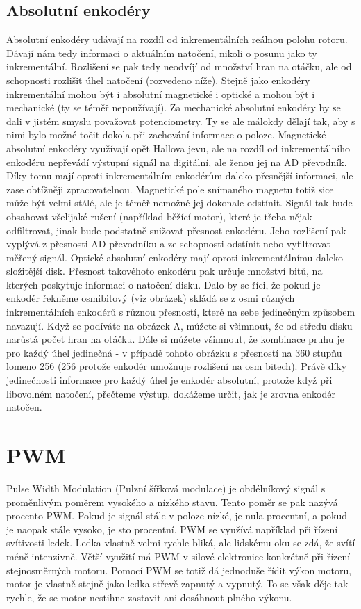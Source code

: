 \documentclass{template/socthesis}
\begin{document}
	\subsection*{Absolutní enkodéry}
	Absolutní enkodéry udávají na rozdíl od inkrementálních reálnou polohu rotoru. Dávají nám tedy informaci o aktuálním natočení, nikoli o posunu jako ty inkrementální. Rozlišení se pak tedy neodvíjí od množství hran na otáčku, ale od schopnosti rozlišit úhel natočení (rozvedeno níže). Stejně jako enkodéry inkrementální mohou být i absolutní magnetické i optické a mohou být i mechanické (ty se téměř nepoužívají). Za mechanické absolutní enkodéry by se dali v jistém smyslu považovat potenciometry. Ty se ale málokdy dělají tak, aby s nimi bylo možné točit dokola při zachování informace o poloze. Magnetické absolutní enkodéry využívají opět Hallova jevu, ale na rozdíl od inkrementálního enkodéru nepřevádí výstupní signál na digitální, ale ženou jej na AD převodník. Díky tomu mají oproti inkrementálním enkodérům daleko přesnější informaci, ale zase obtížněji zpracovatelnou. Magnetické pole snímaného magnetu totiž sice může být velmi stálé, ale je téměř nemožné jej dokonale odstínit. Signál tak bude obsahovat všelijaké rušení (například běžící motor), které je třeba nějak odfiltrovat, jinak bude podstatně snižovat přesnost enkodéru. Jeho rozlišení pak vyplývá z přesnosti AD převodníku a ze schopnosti odstínit nebo vyfiltrovat měřený signál. Optické absolutní enkodéry mají oproti inkrementálnímu daleko složitější disk. Přesnost takovéhoto enkodéru pak určuje množství bitů, na kterých poskytuje informaci o natočení disku. Dalo by se říci, že pokud je enkodér řekněme osmibitový (viz obrázek) skládá se z osmi různých inkrementálních enkodérů s různou přesností, které na sebe jedinečným způsobem navazují.	Když se podíváte na obrázek A, můžete si všimnout, že od středu disku narůstá počet hran na otáčku. Dále si můžete všimnout, že kombinace pruhu je pro každý úhel jedinečná - v případě tohoto obrázku s přesností na 360 stupňu lomeno 256 (256 protože enkodér umožnuje rozlišení na osm bitech). Právě díky jedinečnosti informace pro každý úhel je enkodér absolutní, protože když při libovolném natočení, přečteme výstup, dokážeme určit, jak je zrovna enkodér natočen.
	
	\section*{PWM}
	Pulse Width Modulation (Pulzní šířková modulace) je obdélníkový signál s proměnlivým poměrem vysokého a nízkého stavu. Tento poměr se pak nazývá procento PWM. Pokud je signál stále v poloze nízké, je nula procentní, a pokud je naopak stále vysoko, je sto procentní.
	PWM se využívá například při řízení svítivosti ledek. Ledka vlastně velmi rychle bliká, ale lidskému oku se zdá, že svítí méně intenzivně. 
	Větší využití má PWM v silové elektronice konkrétně při řízení stejnosměrných motoru. Pomocí PWM se totiž dá jednoduše řídit výkon motoru, motor je vlastně stejně jako ledka střevě zapnutý a vypnutý. To se však děje tak rychle, že se motor nestihne zastavit ani dosáhnout plného výkonu.
	
\end{document}

